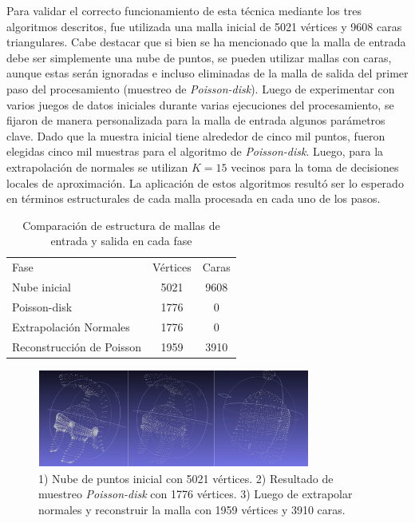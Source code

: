 Para validar el correcto funcionamiento de esta técnica mediante los tres algoritmos descritos, fue utilizada una malla inicial de 5021 vértices y 9608 caras triangulares. Cabe destacar que si bien se ha mencionado que la malla de entrada debe ser simplemente una nube de puntos, se pueden utilizar mallas con caras, aunque estas serán ignoradas e incluso eliminadas de la malla de salida del primer paso del procesamiento (muestreo de \emph{Poisson-disk}).
Luego de experimentar con varios juegos de datos iniciales durante varias ejecuciones del procesamiento, se fijaron de manera personalizada para la malla de entrada algunos parámetros clave. Dado que la muestra inicial tiene alrededor de cinco mil puntos, fueron elegidas cinco mil muestras para el algoritmo de \emph{Poisson-disk}. Luego, para la extrapolación de normales se utilizan $K=15$ vecinos para la toma de decisiones locales de aproximación.
La aplicación de estos algoritmos resultó ser lo esperado en términos estructurales de cada malla procesada en cada uno de los pasos.

\begin{table}
\begin{center}
\begin{tabular}{|l||cc|} \hline
  Fase & Vértices & Caras \\
  Nube inicial & 5021 & 9608 \\
  Poisson-disk & 1776 & 0 \\
  Extrapolación Normales & 1776 & 0 \\
  Reconstrucción de Poisson & 1959 & 3910 \\ \hline %
\end{tabular}
\caption{Comparación de estructura de mallas de entrada y salida en cada fase}
\end{center}
\end{table}

\begin{figure}[H]
  \centering
    \includegraphics[width=0.8\textwidth]{./Cap2_videomapping/malla-nubepuntos.png}
  \caption{1) Nube de puntos inicial con 5021 vértices. 2) Resultado de muestreo \emph{Poisson-disk} con 1776 vértices. 3) Luego de extrapolar normales y reconstruir la malla con 1959 vértices y 3910 caras.}
  \label{fig:Mesh-Results}
\end{figure}
 